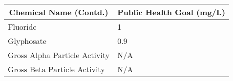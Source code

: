 \newpage
\begin{table}[]
\begin{tabular}{|m{9cm}|m{5cm}|}
\hline
\multicolumn{1}{|c|}{\textbf{Chemical Name (Contd.)}}                        & \multicolumn{1}{c|}{\textbf{Public Health Goal (mg/L)}} \\ \hline

Fluoride                                                            & 1                                                       \\ \hline
Glyphosate                                                          & 0.9                                                     \\ \hline
Gross Alpha Particle Activity                                       & N/A                                                     \\ \hline
Gross Beta Particle Activity                                        & N/A                                                     \\ \hline


\end{tabular}
\end{table}
